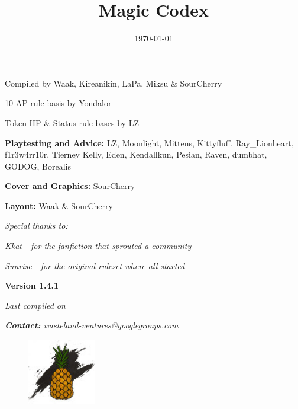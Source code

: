 \documentclass[11pt,a4paper,twocolumn]{book}
\title{Magic Codex}
\date{\today}
\begin{document}
	
		
	\onecolumn
	\begin{center}
		Compiled by Waak, Kireanikin, LaPa, Miksu \& SourCherry
		
		10 AP rule basis by Yondalor
		
		Token HP \& Status rule bases by LZ
		
		\bigskip		
		\textbf{Playtesting and Advice:} LZ, Moonlight, Mittens, Kittyfluff, Ray\_Lionheart, f1r3w4rr10r, Tierney Kelly, Eden, Kendallkun, Pesian, Raven, dumbhat, GODOG, Borealis
		
		\bigskip
		\textbf{Cover and Graphics:} SourCherry
		
		\bigskip
		\textbf{Layout:} Waak \& SourCherry
		
		\bigskip
		\emph{	Special thanks to:}
		
		\emph{	Kkat - for the fanfiction that sprouted a community}
			
		\emph{	Sunrise - for the original ruleset where all started}
	\end{center}
	
	\vfill
	
	\begin{center}
		\textbf{Version 1.4.1}
		
		\emph{Last compiled on \thedate}
        
        \emph{\textbf{Contact:} wasteland-ventures@googlegroups.com}
     
	\end{center}	
    \begin{figure}[bp]
		\centering
		\includegraphics[width=3cm]{ART/ISA_Logo}
	\end{figure}

	\twocolumn
	\tableofcontents

%
\end{document}
